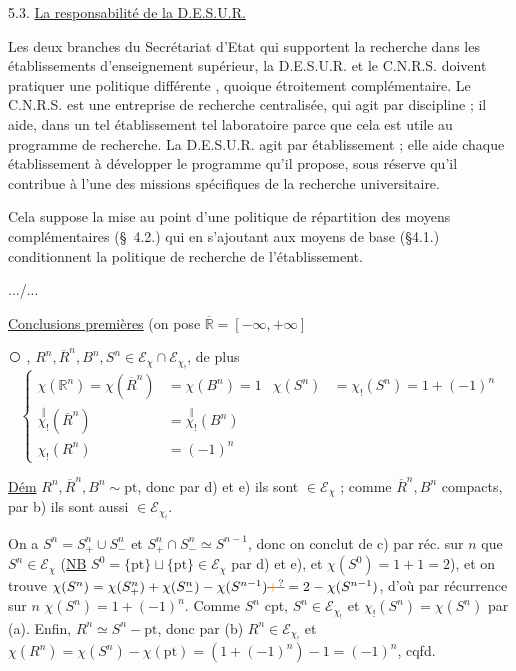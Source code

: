 5.3. \uline{La responsabilité de la D.E.S.U.R.}

Les deux branches du Secrétariat d'Etat qui supportent la
recherche dans les établissements d'enseignement supérieur, la D.E.S.U.R. et le
C.N.R.S. doivent pratiquer une politique différente , quoique étroitement complémentaire. Le C.N.R.S. est une entreprise de recherche centralisée, qui agit par
discipline ; il aide, dans un tel établissement tel laboratoire parce que cela est
utile au programme de recherche. La D.E.S.U.R. agit par établissement ; elle aide
chaque établissement à développer le programme qu'il propose, sous réserve qu'il
contribue à l'une des missions spécifiques de la recherche universitaire.

Cela suppose la mise au point d'une politique de répartition
des moyens complémentaires (\S\ 4.2.) qui en s'ajoutant aux moyens de base (\S4.1.)
conditionnent la politique de recherche de l'établissement.

\hfill .../...


\uline{Conclusions premières} (on pose $\overline{\mathbb R}=[-\infty,+\infty]$


\textcircled{}  , $R^n,\overline R^n,B^n,S^n\in\mathcal E_\chi\cap\mathcal E_{\chi_!}$, de plus
\[
\left\{\begin{aligned}
\chi(\mathbb R^n)=\chi(\overline R^n)&=\chi(B^n)=1 & \chi(S^n)&=\chi_!(S^n)=1+(-1)^n\\
\overset{\Vert}{\chi_!}(\overline R^n)&=\overset{\Vert}{\chi_!}(B^n)\\
\chi_!(R^n)&=(-1)^n
\end{aligned}\right.
\]

\uline{Dém} $R^n,\overline R^n,B^n\sim\mathrm{pt}$, donc par d) et e) ils sont $\in\mathcal E_\chi$ ; comme $\overline R^n,B^n$ compacts, par b) ils sont aussi $\in\mathcal E_{\chi_!}$.

On a $S^n=S^n_+\cup S^n_-$ et $S^n_+\cap S^n_-\simeq S^{n-1}$,  donc on conclut de c) par réc. sur $n$ que $S^n\in\mathcal E_\chi$ (\uline{NB} $S^0=\{\mathrm{pt}\}\sqcup\{\mathrm{pt}\}\in\mathcal E_\chi$ par d) et e), et $\chi(S^0)=1+1=2$), et on trouve $\chi(S^n)=\chi(S^n_+)+\chi(S^n_-)-\chi(S^{n-1})\deleted{\unsure{+}}=2-\chi(S^{n-1})$, d'où par récurrence sur $n$ $\chi(S^n)=1+(-1)^n$. Comme $S^n$ cpt, $S^n\in\mathcal E_{\chi_!}$ et $\chi_!(S^n)=\chi(S^n)$ par (a). Enfin, $R^n\simeq S^n-\mathrm{pt}$, donc par (b) $R^n\in\mathcal E_{\chi_!}$ et $\chi(R^n)=\chi(S^n)-\chi(\mathrm{pt})=(1+(-1)^n)-1=(-1)^n$, cqfd.

